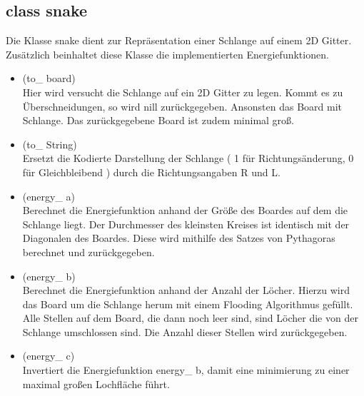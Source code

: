 \documentclass[a4paper,10pt,fleqn]{scrartcl}
\begin{document}
\subsection*{class snake}
Die Klasse snake dient zur Repräsentation einer Schlange auf einem 2D Gitter. Zusätzlich beinhaltet diese Klasse die implementierten Energiefunktionen.
\begin{itemize}
\item (to\_ board)\\
Hier wird versucht die Schlange auf ein 2D Gitter zu legen. Kommt es zu Überschneidungen, so wird nill zurückgegeben. Ansonsten das Board mit Schlange. Das zurückgegebene Board ist zudem minimal groß.
\item (to\_ String) \\
Ersetzt die Kodierte Darstellung der Schlange ( 1 für Richtungsänderung, 0 für Gleichbleibend ) durch die Richtungsangaben R und L.
\item (energy\_ a) \\
Berechnet die Energiefunktion anhand der Größe des Boardes auf dem die Schlange liegt. Der Durchmesser des kleinsten Kreises ist identisch mit der Diagonalen des Boardes. Diese wird mithilfe des Satzes von Pythagoras berechnet und zurückgegeben.
\item (energy\_ b) \\
Berechnet die Energiefunktion anhand der Anzahl der Löcher. Hierzu wird das Board um die Schlange herum mit einem Flooding Algorithmus gefüllt. Alle Stellen auf dem Board, die dann noch leer sind, sind Löcher die von der Schlange umschlossen sind.
Die Anzahl dieser Stellen wird zurückgegeben.
\item (energy\_ c) \\
Invertiert die Energiefunktion energy\_ b, damit eine minimierung zu einer maximal großen Lochfläche führt.
\end{itemize}
\end{document}
